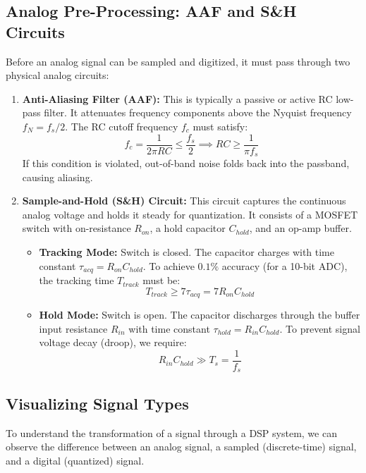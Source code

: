 \documentclass[11pt,a4paper]{article}
\begin{document}
\subsection{Analog Pre-Processing: AAF and S\&H Circuits}
Before an analog signal can be sampled and digitized, it must pass through two physical analog circuits:
\begin{enumerate}
    \item \textbf{Anti-Aliasing Filter (AAF):} This is typically a passive or active RC low-pass filter. It attenuates frequency components above the Nyquist frequency $f_N = f_s/2$. The RC cutoff frequency $f_c$ must satisfy:
    \begin{equation}
    f_c = \frac{1}{2\pi R C} \le \frac{f_s}{2} \implies R C \ge \frac{1}{\pi f_s}
    \end{equation}
    If this condition is violated, out-of-band noise folds back into the passband, causing aliasing.
    
    \item \textbf{Sample-and-Hold (S\&H) Circuit:} This circuit captures the continuous analog voltage and holds it steady for quantization. It consists of a MOSFET switch with on-resistance $R_{on}$, a hold capacitor $C_{hold}$, and an op-amp buffer.
    \begin{itemize}
        \item \textbf{Tracking Mode:} Switch is closed. The capacitor charges with time constant $\tau_{acq} = R_{on} C_{hold}$. To achieve $0.1\%$ accuracy (for a 10-bit ADC), the tracking time $T_{track}$ must be:
        \begin{equation}
        T_{track} \ge 7 \tau_{acq} = 7 R_{on} C_{hold}
        \end{equation}
        \item \textbf{Hold Mode:} Switch is open. The capacitor discharges through the buffer input resistance $R_{in}$ with time constant $\tau_{hold} = R_{in} C_{hold}$. To prevent signal voltage decay (droop), we require:
        \begin{equation}
        R_{in} C_{hold} \gg T_s = \frac{1}{f_s}
        \end{equation}
    \end{itemize}
\end{enumerate}

\subsection{Visualizing Signal Types}
To understand the transformation of a signal through a DSP system, we can observe the difference between an analog signal, a sampled (discrete-time) signal, and a digital (quantized) signal.
\end{document}
